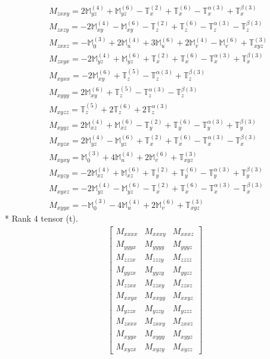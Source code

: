 \documentclass[fleqn,8pt,landscape]{jsarticle}
\begin{document}
\begin{align*}
& M_{zxxy} = 2 \mathbb{M}_{yz}^{(4)} + \mathbb{M}_{yz}^{(6)} - \mathbb{T}_{x}^{(2)} + \mathbb{T}_{x}^{(6)} - \mathbb{T}_{x}^{\alpha(3)} + \mathbb{T}_{x}^{\beta(3)} \\
& M_{zxzy} = - 2 \mathbb{M}_{xy}^{(4)} - \mathbb{M}_{xy}^{(6)} - \mathbb{T}_{z}^{(2)} + \mathbb{T}_{z}^{(6)} - \mathbb{T}_{z}^{\alpha(3)} - \mathbb{T}_{z}^{\beta(3)} \\
& M_{zxxz} = - \mathbb{M}_{0}^{(3)} + 2 \mathbb{M}_{u}^{(4)} + 3 \mathbb{M}_{u}^{(6)} + 2 \mathbb{M}_{v}^{(4)} - \mathbb{M}_{v}^{(6)} + \mathbb{T}_{xyz}^{(3)} \\
& M_{zxyx} = - 2 \mathbb{M}_{yz}^{(4)} + \mathbb{M}_{yz}^{(6)} + \mathbb{T}_{x}^{(2)} + \mathbb{T}_{x}^{(6)} - \mathbb{T}_{x}^{\alpha(3)} + \mathbb{T}_{x}^{\beta(3)} \\
& M_{xyxx} = - 2 \mathbb{M}_{xy}^{(6)} + \mathbb{T}_{z}^{(5)} - \mathbb{T}_{z}^{\alpha(3)} + \mathbb{T}_{z}^{\beta(3)} \\
& M_{xyyy} = 2 \mathbb{M}_{xy}^{(6)} + \mathbb{T}_{z}^{(5)} - \mathbb{T}_{z}^{\alpha(3)} - \mathbb{T}_{z}^{\beta(3)} \\
& M_{xyzz} = \mathbb{T}_{z}^{(5)} + 2 \mathbb{T}_{z}^{(6)} + 2 \mathbb{T}_{z}^{\alpha(3)} \\
& M_{xyyz} = 2 \mathbb{M}_{xz}^{(4)} + \mathbb{M}_{xz}^{(6)} - \mathbb{T}_{y}^{(2)} + \mathbb{T}_{y}^{(6)} - \mathbb{T}_{y}^{\alpha(3)} + \mathbb{T}_{y}^{\beta(3)} \\
& M_{xyzx} = 2 \mathbb{M}_{yz}^{(4)} - \mathbb{M}_{yz}^{(6)} + \mathbb{T}_{x}^{(2)} + \mathbb{T}_{x}^{(6)} - \mathbb{T}_{x}^{\alpha(3)} - \mathbb{T}_{x}^{\beta(3)} \\
& M_{xyxy} = \mathbb{M}_{0}^{(3)} + 4 \mathbb{M}_{u}^{(4)} + 2 \mathbb{M}_{v}^{(6)} + \mathbb{T}_{xyz}^{(3)} \\
& M_{xyzy} = - 2 \mathbb{M}_{xz}^{(4)} + \mathbb{M}_{xz}^{(6)} + \mathbb{T}_{y}^{(2)} + \mathbb{T}_{y}^{(6)} - \mathbb{T}_{y}^{\alpha(3)} + \mathbb{T}_{y}^{\beta(3)} \\
& M_{xyxz} = - 2 \mathbb{M}_{yz}^{(4)} - \mathbb{M}_{yz}^{(6)} - \mathbb{T}_{x}^{(2)} + \mathbb{T}_{x}^{(6)} - \mathbb{T}_{x}^{\alpha(3)} - \mathbb{T}_{x}^{\beta(3)} \\
& M_{xyyx} = - \mathbb{M}_{0}^{(3)} - 4 \mathbb{M}_{u}^{(4)} + 2 \mathbb{M}_{v}^{(6)} + \mathbb{T}_{xyz}^{(3)}
\end{align*}
* Rank 4 tensor (t).
\begin{align*}
\begin{bmatrix} M_{xxxx} & M_{xxxy} & M_{xxxz} \\ M_{yyyx} & M_{yyyy} & M_{yyyz} \\ M_{zzzx} & M_{zzzy} & M_{zzzz} \\ M_{yyzx} & M_{yyzy} & M_{yyzz} \\ M_{zzxx} & M_{zzxy} & M_{zzxz} \\ M_{xxyx} & M_{xxyy} & M_{xxyz} \\ M_{yzzx} & M_{yzzy} & M_{yzzz} \\ M_{zxxx} & M_{zxxy} & M_{zxxz} \\ M_{xyyx} & M_{xyyy} & M_{xyyz} \\ M_{xyzx} & M_{xyzy} & M_{xyzz} \end{bmatrix}
\end{align*}
\end{document}
